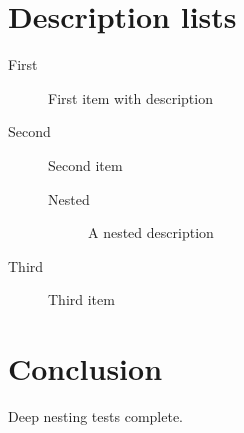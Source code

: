 \documentclass{article}
\begin{document}
\section{Description lists}

\begin{description}
  \item[First] First item with description
  \item[Second] Second item
        \begin{description}
          \item[Nested] A nested description
        \end{description}
  \item[Third] Third item
\end{description}

\section{Conclusion}

Deep nesting tests complete.
\end{document}
